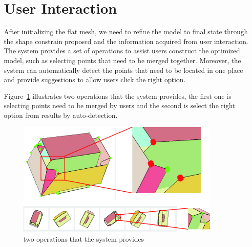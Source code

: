 \section{User Interaction}\label{sec:interaction}
After initializing the flat mesh, we need to refine the model to final state through the shape constrain proposed and the information acquired from user interaction. The system provides a set of operations to assist users construct the optimized model, such as selecting points that need to be merged together. Moreover, the system can automatically detect the points that need to be located in one place and provide suggestions to allow users click the right option.

Figure~\ref{fig:interface} illustrates two operations that the system provides, the first one is selecting points need to be merged by users and the second is select the right option from results by auto-detection.   

\begin{figure}
	\centering
	\includegraphics[width=0.9\textwidth]{images/UIdetail.jpg}
	\caption{two operations that the system provides}
	\label{fig:interface}
\end{figure}


